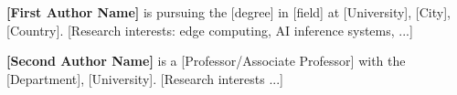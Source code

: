 \documentclass{article}
\begin{document}
\noindent\textbf{[First Author Name]} is pursuing the [degree] in [field] at [University], [City], [Country]. [Research interests: edge computing, AI inference systems, ...]

\noindent\textbf{[Second Author Name]} is a [Professor/Associate Professor] with the [Department], [University]. [Research interests ...]
\end{document}
